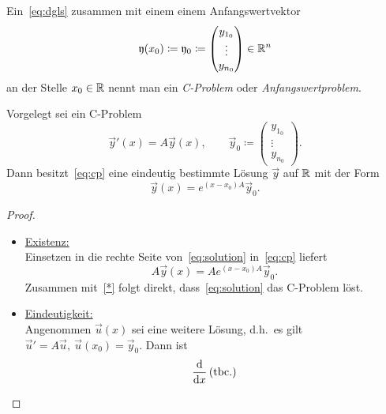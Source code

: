 Ein~\ref{eq:dgls} zusammen mit einem einem Anfangswertvektor
\begin{equation*}
    \mathfrak{y}(x_0) \coloneqq \mathfrak{y}_0 \coloneqq \begin{pmatrix} y_{1_0}\\ \vdots\\ y_{n_0} \end{pmatrix} \in \mathbb{R}^n
\end{equation*}
an der Stelle $x_0 \in \mathbb{R}$ nennt man ein \emph{C-Problem} oder \emph{Anfangswertproblem}.

\begin{theorem}
    Vorgelegt sei ein C-Problem
    \begin{equation}\tag{CP}\label{eq:cp}
        \vec{y}'(x) = A \vec{y}(x), \qquad \vec{y}_0 \coloneqq \begin{pmatrix} y_{1_0}\\ \vdots\\ y_{n_0} \end{pmatrix}.
    \end{equation}
    Dann besitzt~\eqref{eq:cp} eine eindeutig bestimmte Lösung $\vec{y}$ auf $\mathbb{R}$ mit der Form
    \begin{equation}\tag{$\ast$}\label{eq:solution}
        \vec{y}(x) = e^{(x - x_0) A} \vec{y}_0.
    \end{equation}
\end{theorem}

\begin{proof}
    \begin{itemize}
        \item   \underline{Existenz:}\\
                Einsetzen in die rechte Seite von~\eqref{eq:solution} in~\eqref{eq:cp} liefert
                \begin{equation*}
                    A \vec{y}(x) = A e^{(x - x_0) A} \vec{y}_0.
                \end{equation*}
                Zusammen mit~\eqref{*} folgt direkt, dass~\eqref{eq:solution} das C-Problem löst.

        \item   \underline{Eindeutigkeit:}\\
                Angenommen $\vec{u}(x)$ sei eine weitere Lösung, d.h.~es gilt $\vec{u}' = A \vec{u},\ \vec{u}(x_0) = \vec{y}_0$.
                Dann ist
                \begin{align*}
                    \frac{\mathrm{d} }{\mathrm{d} x} \left( \text{tbc.} \right)
                \end{align*}
    \end{itemize}
\end{proof}